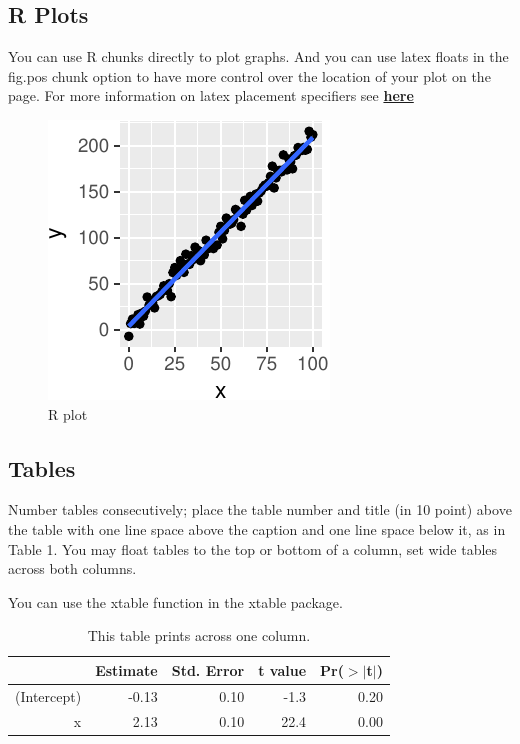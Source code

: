 \documentclass[10pt, letterpaper]{article}
\newenvironment{CodeChunk}{}{}
\begin{document}
\subsection{R Plots}\label{r-plots}

You can use R chunks directly to plot graphs. And you can use latex
floats in the fig.pos chunk option to have more control over the
location of your plot on the page. For more information on latex
placement specifiers see
\textbf{\href{https://en.wikibooks.org/wiki/LaTeX/Floats,_Figures_and_Captions}{here}}

\begin{CodeChunk}
\begin{figure}[H]

{\centering \includegraphics{figs/plot-1} 

}

\caption[R plot]{R plot}\label{fig:plot}
\end{figure}
\end{CodeChunk}

\subsection{Tables}\label{tables}

Number tables consecutively; place the table number and title (in 10
point) above the table with one line space above the caption and one
line space below it, as in Table 1. You may float tables to the top or
bottom of a column, set wide tables across both columns.

You can use the xtable function in the xtable package.

\begin{table}[H]
\centering
\begin{tabular}{rrrrr}
  \hline
 & Estimate & Std. Error & t value & Pr($>$$|$t$|$) \\ 
  \hline
(Intercept) & -0.13 & 0.10 & -1.3 & 0.20 \\ 
  x & 2.13 & 0.10 & 22.4 & 0.00 \\ 
   \hline
\end{tabular}
\caption{This table prints across one column.} 
\end{table}
\end{document}
